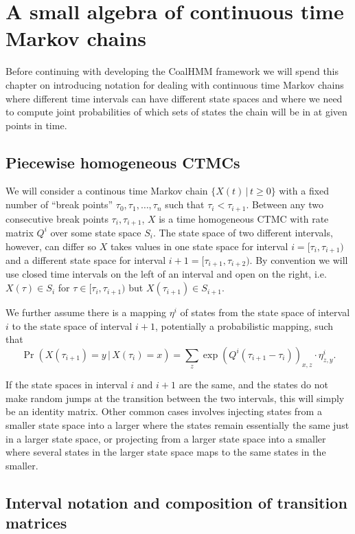 \chapter{A small algebra of continuous time Markov chains}
\label{chap:CTMC-algebra}

Before continuing with developing the CoalHMM framework we will spend this chapter on introducing notation for dealing with continuous time Markov chains where different time intervals can have different state spaces and where we need to compute joint probabilities of which sets of states the chain will be in at given points in time.

\section{Piecewise homogeneous CTMCs}

We will consider a continous time Markov chain $\{ X(t) \,|\, t \geq 0\}$ with a fixed number of ``break points'' $\tau_0, \tau_1, \ldots, \tau_n$ such that $\tau_i < \tau_{i+1}$. Between any two consecutive break points $\tau_i,\tau_{i+1}$, $X$ is a time homogeneous CTMC with rate matrix $Q^{i}$ over some state space $S_i$. The state space of two different intervals, however, can differ so $X$ takes values in one state space for interval $i=[\tau_i,\tau_{i+1})$ and a different state space for interval $i+1=[\tau_{i+1},\tau_{i+2})$. By convention we will use closed time intervals on the left of an interval and open on the right, i.e.\ $X(\tau)\in S_i$ for $\tau\in[\tau_i,\tau_{i+1})$ but $X(\tau_{i+1})\in S_{i+1}$.

We further assume there is a mapping $\eta^i$ of states from the state space of interval $i$ to the state space of interval $i+1$, potentially a probabilistic mapping, such that 
\[
    \Pr\left(X(\tau_{i+1})=y\,|\,X(\tau_{i})=x\right) 
        = \sum_z \exp\left(Q^i\left(\tau_{i+1}-\tau_i\right)\right)_{x,z} \cdot \eta^i_{z,y}
    .
\]

If the state spaces in interval $i$ and $i+1$ are the same, and the states do not make random jumps at the transition between the two intervals, this will simply be an identity matrix. Other common cases involves injecting states from a smaller state space into a larger where the states remain essentially the same just in a larger state space, or projecting from a larger state space into a smaller where several states in the larger state space maps to the same states in the smaller.

\section{Interval notation and composition of transition matrices}

